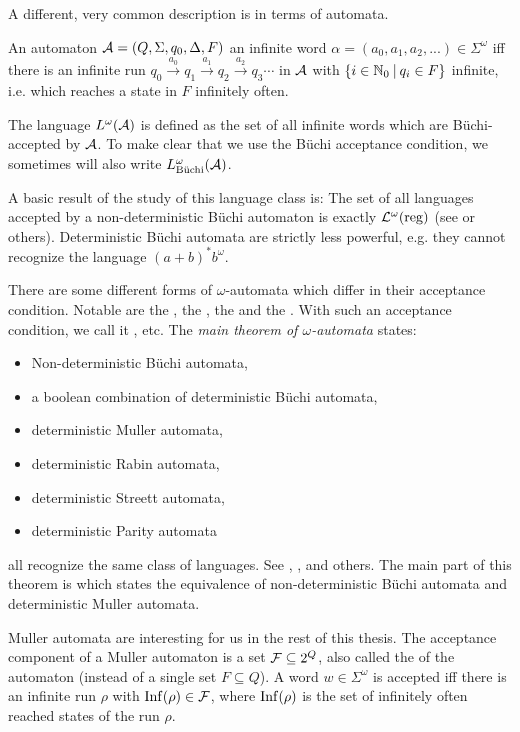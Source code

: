A different, very common description is in terms of automata.

An automaton $\mathcal{A} = (Q, \Sigma, q_0, \Delta, F)$  an infinite word $\alpha = (a_0,a_1,a_2,...) \in \Sigma^\omega$ iff there is an infinite run $q_0 \xrightarrow{a_0} q_1 \xrightarrow{a_1} q_2 \xrightarrow{a_2} q_3 \cdots$ in $\mathcal{A}$ with $\Set{ i \in \N_0 }{ q_i \in F }$ infinite, i.e. which reaches a state in $F$ infinitely often.

The language $L^\omega(\mathcal{A})$ is defined as the set of all infinite words which are Büchi-accepted by  $\mathcal{A}$. To make clear that we use the Büchi acceptance condition, we sometimes will also write $L^\omega_\text{Büchi}(\mathcal{A})$.

A basic result of the study of this language class is: The set of all languages accepted by a non-deterministic Büchi automaton is exactly $\mathcal{L}^\omega(\textup{\textrm{reg}})$ (see \cite{InfCompR101} or others). %
Deterministic Büchi automata are strictly less powerful, e.g. they cannot recognize the language $(a+b)^* b^\omega$.

There are some different forms of $\omega$-automata which differ in their acceptance condition. Notable are the , the , the  and the . With such an acceptance condition, we call it , etc. The \emph{main theorem of $\omega$-automata} states:
\begin{itemize}
\item Non-deterministic Büchi automata,
\item a boolean combination of deterministic Büchi automata,
\item deterministic Muller automata,
\item deterministic Rabin automata,
\item deterministic Streett automata,
\item deterministic Parity automata
\end{itemize}
all recognize the same class of languages. See \cite{InfCompR101}, \cite{LangAutLogicR102}, \cite{InfWordsR110} and others. The main part of this theorem is  which states the equivalence of non-deterministic Büchi automata and deterministic Muller automata.

Muller automata are interesting for us in the rest of this thesis. The acceptance component of a Muller automaton is a set $\mathcal{F} \subseteq 2^Q$, also called the  of the automaton (instead of a single set $F \subseteq Q$). A word $w \in \Sigma^\omega$ is accepted iff there is an infinite run $\rho$ with $\operatorname{Inf}(\rho) \in \mathcal{F}$, where $\operatorname{Inf}(\rho)$ is the set of infinitely often reached states of the run $\rho$.

